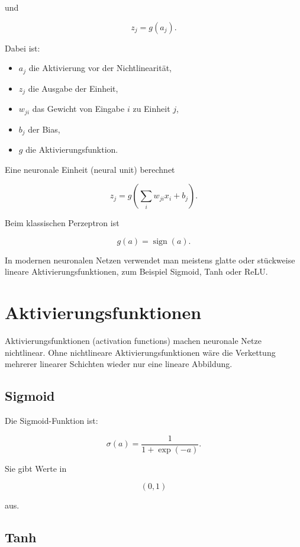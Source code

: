 und

\[
    z_j
    =
    g(a_j).
\]

Dabei ist:

\begin{itemize}
    \item \(a_j\) die Aktivierung vor der Nichtlinearität,
    \item \(z_j\) die Ausgabe der Einheit,
    \item \(w_{ji}\) das Gewicht von Eingabe \(i\) zu Einheit \(j\),
    \item \(b_j\) der Bias,
    \item \(g\) die Aktivierungsfunktion.
\end{itemize}

\begin{definitionbox}
Eine neuronale Einheit (neural unit) berechnet

\[
    z_j
    =
    g
    \left(
        \sum_i
        w_{ji}x_i
        +
        b_j
    \right).
\]
\end{definitionbox}

Beim klassischen Perzeptron ist

\[
    g(a)=\operatorname{sign}(a).
\]

In modernen neuronalen Netzen verwendet man meistens glatte oder stückweise lineare Aktivierungsfunktionen, zum Beispiel Sigmoid, Tanh oder ReLU.

\section{Aktivierungsfunktionen}

Aktivierungsfunktionen (activation functions) machen neuronale Netze nichtlinear.
Ohne nichtlineare Aktivierungsfunktionen wäre die Verkettung mehrerer linearer Schichten wieder nur eine lineare Abbildung.

\subsection{Sigmoid}

Die Sigmoid-Funktion ist:

\[
    \sigma(a)
    =
    \frac{1}{1+\exp(-a)}.
\]

Sie gibt Werte in

\[
    (0,1)
\]

aus.

\subsection{Tanh}

